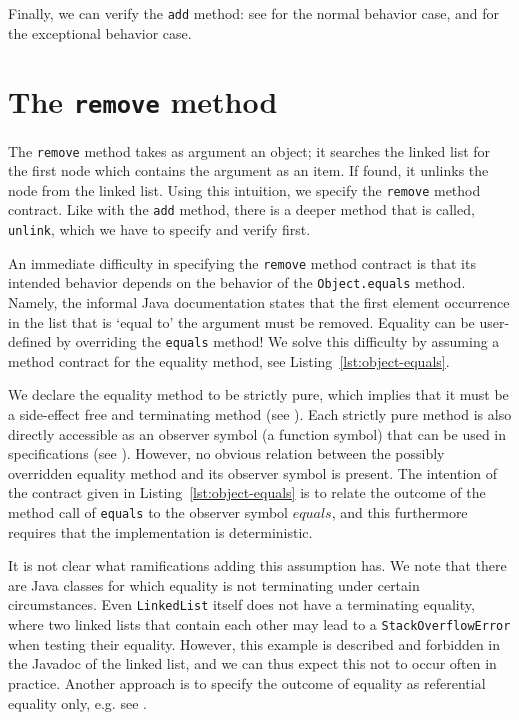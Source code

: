 \documentclass[runningheads]{llncs}
\begin{document}
Finally, we can verify the \texttt{add} method: see  for the normal behavior case, and  for the exceptional behavior case.

\section{The \texttt{remove} method}\label{sec:remove}

The \texttt{remove} method takes as argument an object; it searches the linked list for the first node which contains the argument as an item. If found, it unlinks the node from the linked list. Using this intuition, we specify the \texttt{remove} method contract. Like with the \texttt{add} method, there is a deeper method that is called, \texttt{unlink}, which we have to specify and verify first.

An immediate difficulty in specifying the \texttt{remove} method contract is that its intended behavior depends on the behavior of the \texttt{Object.equals} method. Namely, the informal Java documentation states that the first element occurrence in the list that is `equal to' the argument must be removed. Equality can be user-defined by overriding the \texttt{equals} method! We solve this difficulty by assuming a method contract for the equality method, see Listing~\ref{lst:object-equals}.



We declare the equality method to be strictly pure, which implies that it must be a side-effect free and terminating method (see \cite[Section 7.3.5]{KeYbook}). Each strictly pure method is also directly accessible as an observer symbol (a function symbol) that can be used in specifications (see \cite[Section 8.1.2]{KeYbook}). However, no obvious relation between the possibly overridden equality method and its observer symbol is present. The intention of the contract given in Listing~\ref{lst:object-equals} is to relate the outcome of the method call of \texttt{equals} to the observer symbol $\mathit{equals}$, and this furthermore requires that the implementation is deterministic.

It is not clear what ramifications adding this assumption has. We note that there are Java classes for which equality is not terminating under certain circumstances. Even \texttt{LinkedList} itself does not have a terminating equality, where two linked lists that contain each other may lead to a \texttt{StackOverflowError} when testing their equality. However, this example is described and forbidden in the Javadoc of the linked list, and we can thus expect this not to occur often in practice. Another approach is to specify the outcome of equality as referential equality only, e.g. see \cite[Section 4.4]{huisman2002verification}.
\end{document}
